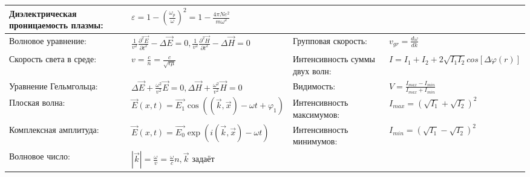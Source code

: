 \documentclass{article}
\begin{document}
\begin{tabular}{ |p{4.1cm}|p{5.4cm}|p{3.9cm}|p{5.6cm}|  }
Диэлектрическая проницаемость плазмы:                                        &  %
$\varepsilon = 1 - (\frac{\omega_p}{\omega})^2 =
 1 - \frac{4 \pi N e^2}{m \omega^2}$                                         \\ %
\hline
Волновое уравнение:                                                          &  %
$\frac{1}{v^2} \frac{\partial^2 \vec{E}}{\partial t^2} - \Delta \vec{E} = 0,
\frac{1}{v^2} \frac{\partial^2 \vec{H}}{\partial t^2} - \Delta \vec{H} = 0$  &  %
Групповая скорость:                                                          &  %
$v_{gr} = \frac{d \omega}{d k}$                                                 \\ %
\hline
Скорость света в среде:                                                      &  %
$v = \frac{c}{n} = \frac{c}{\sqrt{\epsilon\mu}}$                             &  %
Интенсивность суммы двух волн:                                               &  %
$I = I_1 + I_2 + 2 \sqrt{I_1 I_2} cos [\Delta \varphi(r)]$                                       \\ %
\hline
Уравнение Гельмгольца:                                                       &  %
$\Delta \vec{E} + \frac{\omega^2}{v^2} \vec{E} = 0,
\Delta \vec{H} + \frac{\omega^2}{v^2} \vec{H} = 0$                           &  %
Видимость:                                                                   &  %
$V = \frac{I_{max} - I_{min}}{I_{max} + I_{min}}$                                                     \\ %
\hline
Плоская волна:                                                               &  %
$\vec{E}(x, t) = \vec{E_1} \cos((\vec{k}, \vec{x}) - \omega t + \varphi_1)$  &  %
Интенсивность максимумов:                                                    &  %
$I_{max} = (\sqrt{I_1} + \sqrt{I_2})^2$                                      \\ %
\hline
Комплексная амплитуда:                                                       &  %
$\vec{E}(x, t) = \vec{E_0} \exp(i(\vec{k}, \vec{x}) - \omega t)$             &  %
Интенсивность минимумов:                                                     &  %
$I_{min} = (\sqrt{I_1} - \sqrt{I_2})^2$                                      \\ %
\hline
Волновое число:                                                              &  %
$|\vec{k}| = \frac{\omega}{v} = \frac{\omega}{c} n, \vec{k}$ задаёт

\end{tabular}
\end{document}
